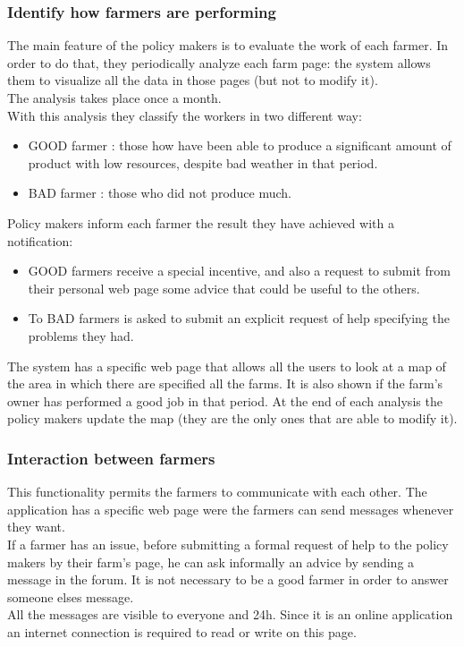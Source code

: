 \subsubsection{Identify how farmers are performing}
The main feature of the policy makers is to evaluate the work of each farmer. 
In order to do that, they periodically analyze each farm page: 
the system allows them to visualize all the data in those pages 
(but not to modify it).\\
The analysis takes place once a month.\\
With this analysis they classify the workers in two different way:
\begin{itemize}
    \item GOOD farmer : those how have been able to produce a significant amount of product with low resources, despite bad weather in that period.
    \item BAD farmer : those who did not produce much.
\end{itemize}
Policy makers inform each farmer the result they have achieved with a notification: 
\begin{itemize}
    \item GOOD farmers receive a special 
    incentive, and also a request to submit 
    from their personal web page some advice that could be useful to the others. 
    \item To BAD farmers is asked to submit an explicit request of help specifying the problems they had.
\end{itemize}
The system has a specific web page that allows all 
the users to look at a map of the area in which there are 
specified all the farms. It is also shown if the farm's owner has performed 
a good job in that period.
At the end of each analysis the policy makers 
update the map (they are the only ones that are able to modify it).


\subsubsection{Interaction between farmers}
This functionality permits the farmers to communicate with each other. 
The application has a specific web page were the farmers can send messages 
whenever they want.\\
If a farmer has an issue, before submitting a formal request of help to 
the policy makers 
by their farm's page, he can ask informally an advice by sending a message 
in the forum.
It is not necessary to be a good farmer in order to answer someone elses 
message.\\ All the messages are visible to everyone and 24h. 
Since it is an online application an internet connection is required 
to read or write on this page.

